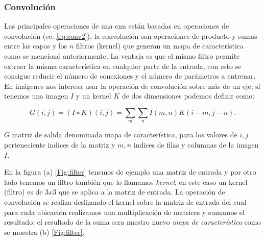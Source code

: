 \subsubsection{Convolución}\label{sub:convolucion}
Las principales operaciones de una \ac{cnn} están basadas en operaciones de convolución (ec. \eqref{eq:conv2}), la convolución son operaciones de producto y sumas entre las capas y los $n$ filtros (kernel) que generan  un mapa de característica como se mencionó anteriormente. La ventaja es que el mismo filtro permite extraer la misma característica en cualquier parte de la entrada, con esto se consigue reducir el número de conexiones y el número de parámetros a entrenar. En imágenes nos interesa usar la operación de convolución sobre más de un eje;  si tenemos una imagen $I$ y un kernel $K$ de dos dimensiones podemos definir como:

\begin{equation}\label{eq:conv2}
    G(i, j) = (I ∗ K)(i, j) = \sum_{m} \sum_{n} I(m, n) K(i - m, j - n).
\end{equation} 

$G$ matriz de salida denominada mapa de característica, para los valores de $i, j$ perteneciente indices  de la matriz y $m, n$ indices de filas y columnas de la imagen $I$.



En la figura (a) \ref{Fig:filter} tenemos de ejemplo una matriz de entrada y por otro lado tenemos un filtro también que lo llamamos \textit{kernel}, en este caso un kernel (filtro) es de $3x3$ que se aplica a la matriz de entrada. La operación de convolución se realiza deslizando el kernel sobre la matriz de entrada del cual para cada ubicación realizamos una multiplicación de matrices y sumamos el resultado; el resultado de la suma sera nuestro nuevo \textit{mapa de característica} como se muestra (b) \ref{Fig:filter}.

